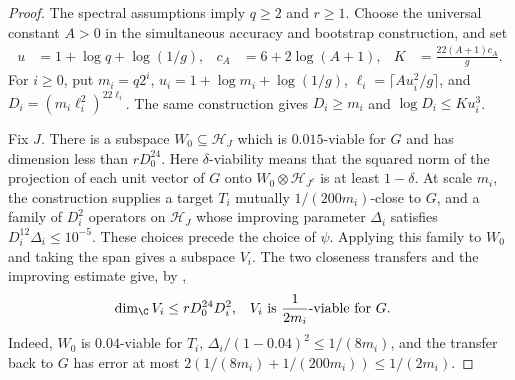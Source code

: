 \begin{proof}
    \leanok
    The spectral assumptions imply $q\ge2$ and $r\ge1$.
    Choose the universal constant $A>0$ in the simultaneous accuracy and
    bootstrap construction, and set
    \begin{align*}
        u & =1+\log q+\log(1/g),
          & c_A                  & =6+2\log(A+1),
          & K                    & =\frac{22(A+1)c_A}{g}.
    \end{align*}
    For $i\ge0$, put $m_i=q2^i$,
    $u_i=1+\log m_i+\log(1/g)$,
    $\ell_i=\lceil A u_i^2/g\rceil$, and
    $D_i=(m_i\ell_i^2)^{22\ell_i}$.
    The same construction gives $D_i\ge m_i$ and $\log D_i\le K u_i^3$.

    Fix $J$. There is a subspace $W_0\subseteq\mathcal H_J$ which is
    $0.015$-viable for $G$ and has dimension less than $rD_0^{24}$.
    Here $\delta$-viability means that the squared norm of the projection of
    each unit vector of $G$ onto $W_0\otimes\mathcal H_{J^c}$ is at least
    $1-\delta$.
    At scale $m_i$, the construction supplies a target $T_i$ mutually
    $1/(200m_i)$-close to $G$, and a family of $D_i^2$ operators on
    $\mathcal H_J$ whose improving parameter $\Delta_i$ satisfies
    $D_i^{12}\Delta_i\le10^{-5}$.
    These choices precede the choice of $\psi$.
    Applying this family to $W_0$ and taking the span gives a subspace $V_i$.
    The two closeness transfers and the improving estimate give, by
    \cite[``Enlargement at a prescribed accuracy'']{QICLean2026Blueprint},
    \begin{align*}
        \dim_{\C}V_i & \le rD_0^{24}D_i^2,
                     & V_i                 & \text{ is }\frac{1}{2m_i}\text{-viable for }G.
    \end{align*}
    Indeed, $W_0$ is $0.04$-viable for $T_i$,
    $\Delta_i/(1-0.04)^2\le1/(8m_i)$, and the transfer back to $G$ has error
    at most $2(1/(8m_i)+1/(200m_i))\le1/(2m_i)$.


\end{proof}

